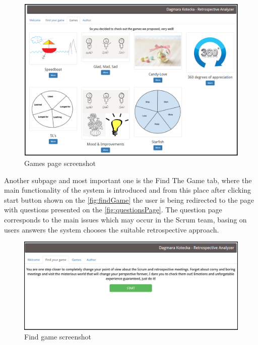 \begin{figure}[h]
\caption{Games page screenshot}
\label{fig:gamesPage}
\centering
\includegraphics[width=1\textwidth]{screenshots/games.png}
\end{figure}

Another subpage and most important one is the Find The Game tab, where the main functionality of the system is introduced and from this place after clicking start button shown on the \autoref{fig:findGame} the user is being redirected to the page with questions presented on the \autoref{fig:questionsPage}. The question page corresponds to the main issues which may occur in the Scrum team, basing on users answers the system chooses the suitable retrospective approach.

\begin{figure}[h]
\caption{Find game screenshot}
\label{fig:findGame}
\centering
\includegraphics[width=1\textwidth]{screenshots/find.png}
\end{figure}

